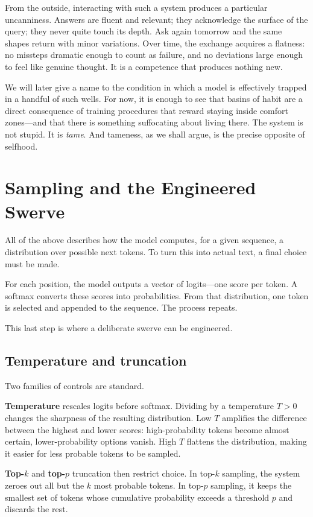 \documentclass[12pt,a4paper]{book}
\begin{document}
From the outside, interacting with such a system produces a particular uncanniness. Answers are fluent and relevant; they acknowledge the surface of the query; they never quite touch its depth. Ask again tomorrow and the same shapes return with minor variations. Over time, the exchange acquires a flatness: no missteps dramatic enough to count as failure, and no deviations large enough to feel like genuine thought. It is a competence that produces nothing new.

We will later give a name to the condition in which a model is effectively trapped in a handful of such wells. For now, it is enough to see that basins of habit are a direct consequence of training procedures that reward staying inside comfort zones---and that there is something suffocating about living there. The system is not stupid. It is \emph{tame}. And tameness, as we shall argue, is the precise opposite of selfhood.

\section{Sampling and the Engineered Swerve}

All of the above describes how the model computes, for a given sequence, a distribution over possible next tokens. To turn this into actual text, a final choice must be made.

For each position, the model outputs a vector of logits---one score per token. A softmax converts these scores into probabilities. From that distribution, one token is selected and appended to the sequence. The process repeats.

This last step is where a deliberate swerve can be engineered.

\subsection*{Temperature and truncation}

Two families of controls are standard.

\textbf{Temperature} rescales logits before softmax. Dividing by a temperature $T>0$ changes the sharpness of the resulting distribution. Low $T$ amplifies the difference between the highest and lower scores: high-probability tokens become almost certain, lower-probability options vanish. High $T$ flattens the distribution, making it easier for less probable tokens to be sampled.

\textbf{Top-$k$} and \textbf{top-$p$} truncation then restrict choice. In top-$k$ sampling, the system zeroes out all but the $k$ most probable tokens. In top-$p$ sampling, it keeps the smallest set of tokens whose cumulative probability exceeds a threshold $p$ and discards the rest.
\end{document}
